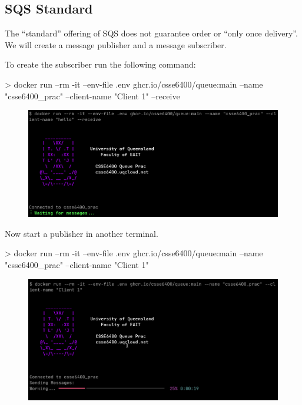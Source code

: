 \documentclass{csse4400}
\begin{document}
\subsection{SQS Standard}

The ``standard'' offering of SQS does not guarantee order or ``only once delivery''. 
We will create a message publisher and a message subscriber.


To create the subscriber run the following command:

\begin{code}[numbers=none,keepspaces=true]{}
> docker run --rm -it --env-file .env ghcr.io/csse6400/queue:main --name "csse6400_prac" --client-name "Client 1" --receive
\end{code}

\begin{figure}[H]
  \includegraphics[width=\textwidth]{images/stacksub}
\end{figure}

Now start a publisher in another terminal.

\begin{code}[numbers=none,keepspaces=true]{}
> docker run --rm -it --env-file .env ghcr.io/csse6400/queue:main --name "csse6400_prac" --client-name "Client 1"
\end{code}

\begin{figure}[H]
  \includegraphics[width=\textwidth]{images/stackpub}
\end{figure}
\end{document}
